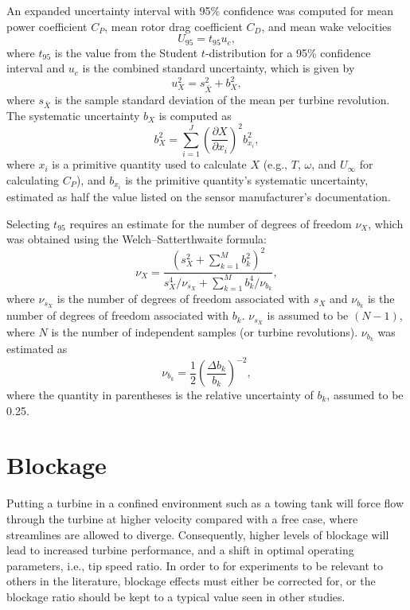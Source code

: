 An expanded uncertainty interval with 95\% confidence was computed for mean
power coefficient $C_P$, mean rotor drag coefficient $C_D$, and mean wake
velocities
\begin{equation}
    U_{95} = t_{95} u_c,
\end{equation}
where $t_{95}$ is the value from the Student $t$-distribution for a 95\%
confidence interval and $u_c$ is the combined standard uncertainty, which is
given by
\begin{equation}
    u_X^2 = s_{\bar{X}}^2 + b_X^2,
\end{equation}
where $s_{\bar{X}}$ is the sample standard deviation of the mean per turbine
revolution. The systematic uncertainty $b_X$ is computed as
\begin{equation}
    b_{X}^2 = \sum_{i=1}^J \left( \frac{\partial X}{\partial x_i} \right)^2
    b_{x_i}^2,
\end{equation}
where $x_i$ is a primitive quantity used to calculate $X$ (e.g., $T$, $\omega$,
and $U_\infty$ for calculating $C_P$), and $b_{x_i}$ is the primitive quantity's
systematic uncertainty, estimated as half the value listed on the sensor
manufacturer's documentation.

Selecting $t_{95}$ requires an estimate for the number of degrees of freedom
$\nu_X$, which was obtained using the Welch--Satterthwaite formula:
\begin{equation}
    \nu_X = \frac{\left(s_X^2 + \sum_{k=1}^M b_k^2 \right)^2} {s_X^4/\nu_{s_X} +
    \sum_{k=1}^M b_k^4/\nu_{b_k}},
\end{equation}
where $\nu_{s_X}$ is the number of degrees of freedom associated with $s_X$ and
$\nu_{b_k}$ is the number of degrees of freedom associated with $b_k$.
$\nu_{s_X}$ is assumed to be $(N-1)$, where $N$ is the number of independent
samples (or turbine revolutions). $\nu_{b_k}$ was estimated as
\begin{equation}
    \nu_{b_k} = \frac{1}{2} \left( \frac{\Delta b_k}{b_k} \right)^{-2},
\end{equation}
where the quantity in parentheses is the relative uncertainty of $b_k$, assumed
to be 0.25.


\section{Blockage}

Putting a turbine in a confined environment such as a towing tank will force
flow through the turbine at higher velocity compared with a free case, where
streamlines are allowed to diverge. Consequently, higher levels of blockage will
lead to increased turbine performance, and a shift in optimal operating
parameters, i.e., tip speed ratio. In order to for experiments to be relevant to
others in the literature, blockage effects must either be corrected for, or the
blockage ratio should be kept to a typical value seen in other studies.


